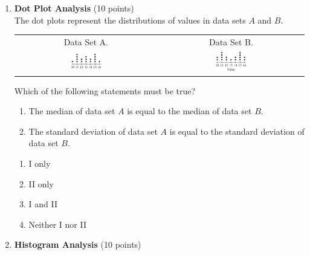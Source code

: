 \begin{enumerate}
  \item \textbf{Dot Plot Analysis} (10 points)\\
  The dot plots represent the distributions of values in data sets $A$ and $B$.
  \begin{center}
  \begin{tabular}{cc}
  Data Set A. & Data Set B. \\
  \includegraphics[width=0.23\textwidth]{images/2025_06_15_04f7426dc644de311e92g-15(1)} &
  \includegraphics[width=0.23\textwidth]{images/2025_06_15_04f7426dc644de311e92g-15} \\
  \end{tabular}
  \end{center}
  Which of the following statements must be true?
  \begin{enumerate}[label=(\Alph*)]
    \item The median of data set $A$ is equal to the median of data set $B$.
    \item The standard deviation of data set $A$ is equal to the standard deviation of data set $B$.
  \end{enumerate}
  \begin{enumerate}[label=(\Alph*)]
    \item I only
    \item II only
    \item I and II
    \item Neither I nor II
  \end{enumerate}
  \begin{subanswer}
  \end{subanswer}

  \newpage

  \item \textbf{Histogram Analysis} (10 points)\\


\end{enumerate}
